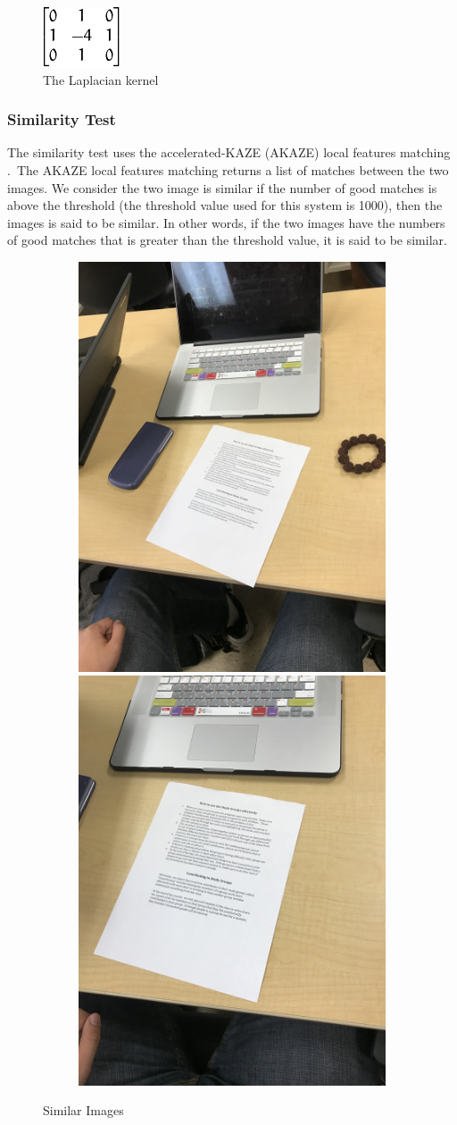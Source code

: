 \begin{figure}
	\centering
    \includegraphics[scale = 0.5]{laplacian_kernel.png}
    
    \caption{The Laplacian kernel}
	\label{laplacianKernel}
\end{figure}

\subsubsection{Similarity Test}
The similarity test uses the accelerated-KAZE (AKAZE) local features matching \cite{akaze}.~The AKAZE local features matching returns a list of matches between the two images. We consider the two image is similar if the number of good matches is above the threshold (the threshold value used for this system is 1000), then the images is said to be similar. In other words, if the two images have the numbers of good matches that is greater than the threshold value, it is said to be similar.

\begin{figure}
  \begin{subfigure}{\linewidth}
	  \includegraphics[width=.4\linewidth]{similar1.JPG}\hfill
	  \includegraphics[width=.4\linewidth]{similar2.JPG}
  \end{subfigure}\par\medskip  
  
    \caption{Similar Images}
	\label{similarImages}
\end{figure}

